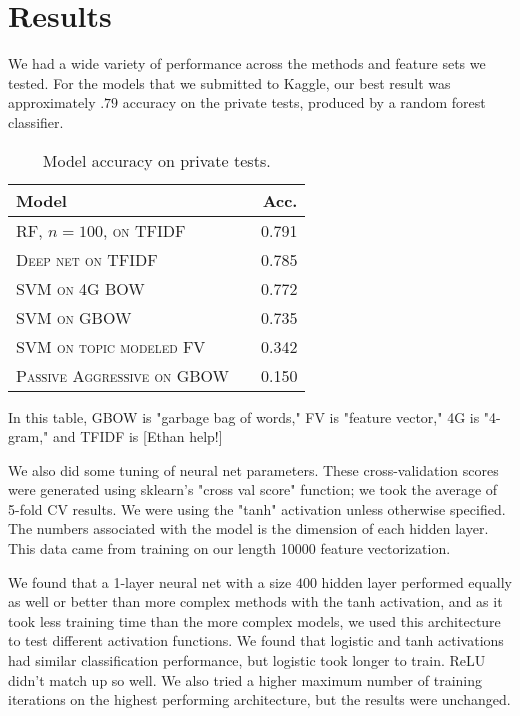 \documentclass[11pt]{article}
\begin{document}
\section{Results}
We had a wide variety of performance across the methods and feature sets we tested. For the models that we submitted to Kaggle, our best result was approximately $.79$ accuracy on the private tests, produced by a random forest classifier.
 \\
\begin{table}
\centering
\begin{tabular}{llr}
	\toprule
	Model &  & Acc. \\
	\midrule
	\textsc{RF, $n=100$, on TFIDF} & & 0.791\\
	\textsc{Deep net on TFIDF} & & 0.785\\
	\textsc{SVM on 4G BOW} & & 0.772 \\
	\textsc{SVM on GBOW} & & 0.735  \\
	\textsc{SVM on topic modeled FV} & & 0.342 \\
	\textsc{Passive Aggressive on GBOW} & & 0.150\\
	\bottomrule
\end{tabular}
\caption{Model accuracy on private tests.}
\end{table}

In this table, GBOW is "garbage bag of words," FV is "feature vector," 4G is "4-gram," and TFIDF is [Ethan help!]

We also did some tuning of neural net parameters. These cross-validation scores were generated using sklearn's "cross val score" function; we took the average of 5-fold CV results. We were using the "tanh" activation unless otherwise specified. The numbers associated with the model is the dimension of each hidden layer. This data came from training on our length 10000 feature vectorization.

We found that a 1-layer neural net with a size $400$ hidden layer performed equally as well or better than more complex methods with the tanh activation, and as it took less training time than the more complex models, we used this architecture to test different activation functions. We found that logistic and tanh activations had similar classification performance, but logistic took longer to train. ReLU didn't match up so well. We also tried a higher maximum number of training iterations on the highest performing architecture, but the results were unchanged.
\end{document}
